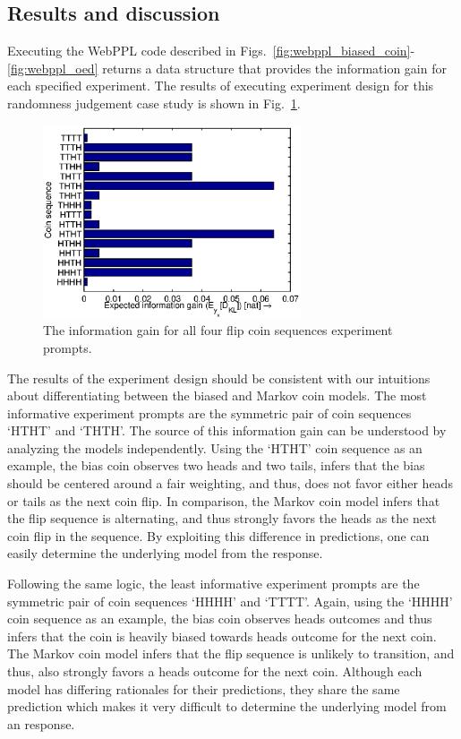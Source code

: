\documentclass{article}
\begin{document}
\subsection{Results and discussion}

Executing the WebPPL code described in Figs.~\ref{fig:webppl_biased_coin}-\ref{fig:webppl_oed} returns a data structure that provides the information gain for each specified experiment. The results of executing experiment design for this randomness judgement case study is shown in Fig.~\ref{fig:coin}.

\begin{figure}[h!]
\centering
\includegraphics[width=3in]{img/coin.eps}
\caption{The information gain for all four flip coin sequences experiment prompts.}
\label{fig:coin}
\end{figure}

The results of the experiment design should be consistent with our intuitions about differentiating between the biased and Markov coin models. The most informative experiment prompts are the symmetric pair of coin sequences `HTHT' and `THTH'. The source of this information gain can be understood by analyzing the models independently. Using the `HTHT' coin sequence as an example, the bias coin observes two heads and two tails, infers that the bias should be centered around a fair weighting, and thus, does not favor either heads or tails as the next coin flip. In comparison, the Markov coin model infers that the flip sequence is alternating, and thus strongly favors the heads as the next coin flip in the sequence. By exploiting this difference in predictions, one can easily determine the underlying model from the response.

Following the same logic, the least informative experiment prompts are the symmetric pair of coin sequences `HHHH' and `TTTT'. Again, using the `HHHH' coin sequence as an example, the bias coin observes heads outcomes and thus infers that the coin is heavily biased towards heads outcome for the next coin. The Markov coin model infers that the flip sequence is unlikely to transition, and thus, also strongly favors a heads outcome for the next coin. Although each model has differing rationales for their predictions, they share the same prediction which makes it very difficult to determine the underlying model from an response. 
\end{document}
